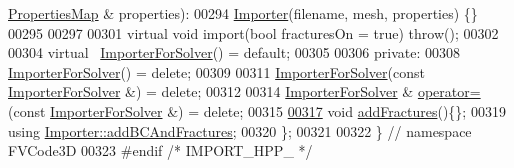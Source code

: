 \begin{DoxyCode}
      \hyperlink{classFVCode3D_1_1PropertiesMap}{PropertiesMap} & properties):
00294         \hyperlink{classFVCode3D_1_1Importer}{Importer}(filename, mesh, properties) \{\}
00295 
00297 
00301     \textcolor{keyword}{virtual} \textcolor{keywordtype}{void} \textcolor{keyword}{import}(\textcolor{keywordtype}{bool} fracturesOn = \textcolor{keyword}{true}) \textcolor{keywordflow}{throw}();
00302 
00304     \textcolor{keyword}{virtual} ~\hyperlink{classFVCode3D_1_1ImporterForSolver}{ImporterForSolver}() = \textcolor{keywordflow}{default};
00305 
00306 \textcolor{keyword}{private}:
00308     \hyperlink{classFVCode3D_1_1ImporterForSolver}{ImporterForSolver}() = \textcolor{keyword}{delete};
00309 
00311     \hyperlink{classFVCode3D_1_1ImporterForSolver}{ImporterForSolver}(\textcolor{keyword}{const} \hyperlink{classFVCode3D_1_1ImporterForSolver}{ImporterForSolver} &) = \textcolor{keyword}{delete};
00312 
00314     \hyperlink{classFVCode3D_1_1ImporterForSolver}{ImporterForSolver} & \hyperlink{classFVCode3D_1_1Importer_a2559d25ef11c7a21e97bb4d17b51aaaf}{operator=}(\textcolor{keyword}{const} 
      \hyperlink{classFVCode3D_1_1ImporterForSolver}{ImporterForSolver} &) = \textcolor{keyword}{delete};
00315 
\hypertarget{Import_8hpp_source.tex_l00317}{}\hyperlink{classFVCode3D_1_1ImporterForSolver_aafb9ee01c07359f0cb1421729ca2fa86}{00317}     \textcolor{keywordtype}{void} \hyperlink{classFVCode3D_1_1ImporterForSolver_aafb9ee01c07359f0cb1421729ca2fa86}{addFractures}()\{\};
00319     \textcolor{keyword}{using} \hyperlink{classFVCode3D_1_1Importer_ac21d82671c21b2e4069511ef0585d7f6}{Importer::addBCAndFractures};
00320 \};
00321 
00322 \} \textcolor{comment}{// namespace FVCode3D}
00323 \textcolor{preprocessor}{#endif }\textcolor{comment}{/* IMPORT\_HPP\_ */}\textcolor{preprocessor}{}
\end{DoxyCode}
